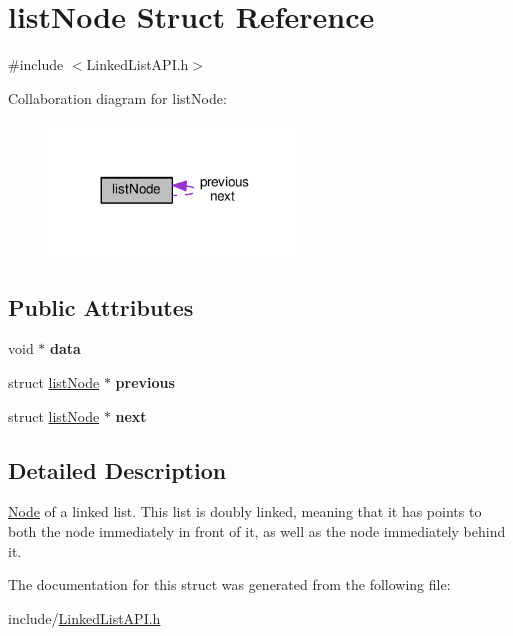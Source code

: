 \hypertarget{structlistNode}{}\section{list\+Node Struct Reference}
\label{structlistNode}


{\ttfamily \#include $<$Linked\+List\+A\+P\+I.\+h$>$}



Collaboration diagram for list\+Node\+:
\nopagebreak
\begin{figure}[H]
\begin{center}
\leavevmode
\includegraphics[width=191pt]{structlistNode__coll__graph}
\end{center}
\end{figure}
\subsection*{Public Attributes}
\begin{DoxyCompactItemize}
\item 
\mbox{\label{structlistNode_a3d954805822577bf67d0a53a99bb337a}} 
void $\ast$ {\bfseries data}
\item 
\mbox{\label{structlistNode_af4cb79db629800938019f92ce510c157}} 
struct \hyperlink{structlistNode}{list\+Node} $\ast$ {\bfseries previous}
\item 
\mbox{\label{structlistNode_a860785ea27fb1c044d6a59ba491dd6ab}} 
struct \hyperlink{structlistNode}{list\+Node} $\ast$ {\bfseries next}
\end{DoxyCompactItemize}


\subsection{Detailed Description}
\hyperlink{structNode}{Node} of a linked list. This list is doubly linked, meaning that it has points to both the node immediately in front of it, as well as the node immediately behind it. 

The documentation for this struct was generated from the following file\+:\begin{DoxyCompactItemize}
\item 
include/\hyperlink{LinkedListAPI_8h}{Linked\+List\+A\+P\+I.\+h}\end{DoxyCompactItemize}

